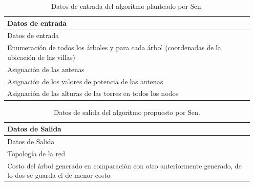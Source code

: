\documentclass[]{article}
\begin{document}
\begin{longtable}[]{@{}l@{}}
\caption{Datos de entrada del algoritmo planteado por
Sen.}\tabularnewline
\toprule
\begin{minipage}[b]{0.97\columnwidth}\raggedright\strut
Datos de entrada\strut
\end{minipage}\tabularnewline
\midrule
\endfirsthead
\toprule
\begin{minipage}[b]{0.97\columnwidth}\raggedright\strut
Datos de entrada\strut
\end{minipage}\tabularnewline
\midrule
\endhead
\begin{minipage}[t]{0.97\columnwidth}\raggedright\strut
Enumeración de todos los árboles y para cada árbol (coordenadas de la
ubicación de las villas)\strut
\end{minipage}\tabularnewline
\begin{minipage}[t]{0.97\columnwidth}\raggedright\strut
Asignación de las antenas\strut
\end{minipage}\tabularnewline
\begin{minipage}[t]{0.97\columnwidth}\raggedright\strut
Asignación de los valores de potencia de las antenas\strut
\end{minipage}\tabularnewline
\begin{minipage}[t]{0.97\columnwidth}\raggedright\strut
Asignación de las alturas de las torres en todos los nodos\strut
\end{minipage}\tabularnewline
\bottomrule
\end{longtable}

\begin{longtable}[]{@{}l@{}}
\caption{Datos de salida del algoritmo propuesto por
Sen.}\tabularnewline
\toprule
\begin{minipage}[b]{0.97\columnwidth}\raggedright\strut
Datos de Salida\strut
\end{minipage}\tabularnewline
\midrule
\endfirsthead
\toprule
\begin{minipage}[b]{0.97\columnwidth}\raggedright\strut
Datos de Salida\strut
\end{minipage}\tabularnewline
\midrule
\endhead
\begin{minipage}[t]{0.97\columnwidth}\raggedright\strut
Topología de la red\strut
\end{minipage}\tabularnewline
\begin{minipage}[t]{0.97\columnwidth}\raggedright\strut
Costo del árbol generado en comparación con otro anteriormente generado,
de lo dos se guarda el de menor costo\strut
\end{minipage}\tabularnewline
\bottomrule
\end{longtable}
\end{document}

